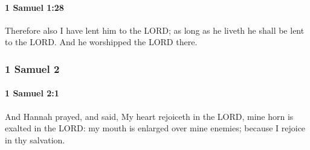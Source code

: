 		\paragraph{1 Samuel 1:28} %
			\label{1SAMUEL-1-28}

			Therefore also I have lent him to the LORD; as long as he liveth he shall be lent to the LORD. And he worshipped the LORD there.

	\subsubsection{1 Samuel 2} %
		\label{1SAMUEL-2}

		\paragraph{1 Samuel 2:1} %
			\label{1SAMUEL-2-1}

			And Hannah prayed, and said, My heart rejoiceth in the LORD, mine horn is exalted in the LORD: my mouth is enlarged over mine enemies; because I rejoice in thy salvation.

